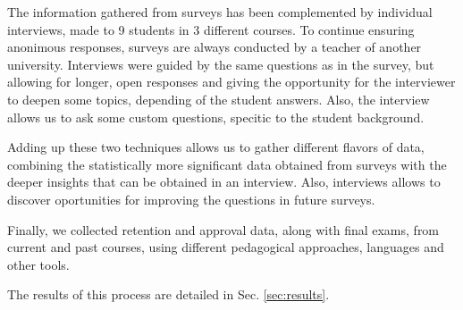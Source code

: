 The information gathered from surveys has been complemented by individual interviews, made to 9 students in 3 different courses.
To continue ensuring anonimous responses, surveys are always conducted by a teacher of another university.
Interviews were guided by the same questions as in the survey, 
but allowing for longer, open responses 
and giving the opportunity for the interviewer to deepen some topics, depending of the student answers.
Also, the interview allows us to ask some custom questions, specitic to the student background.

Adding up these two techniques allows us to gather different flavors of data, 
combining the statistically more significant data obtained from surveys
with the deeper insights that can be obtained in an interview.
Also, interviews allows to discover oportunities for improving the questions in future surveys.


Finally, we collected retention and approval data, along with final exams,
from current and past courses, using different pedagogical approaches, languages and other tools.

The results of this process are detailed in Sec. \ref{sec:results}.

